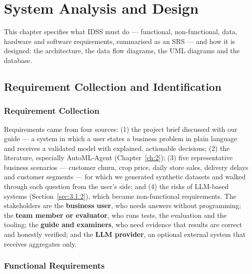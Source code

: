 \chapter{System Analysis and Design}\label{ch:4}

This chapter specifies what IDSS must do --- functional, non-functional, data, hardware and software requirements, summarised as an SRS --- and how it is designed: the architecture, the data flow diagrams, the UML diagrams and the database.

\FloatBarrier
\section{Requirement Collection and Identification}\label{sec:4.1}

\subsection{Requirement Collection}\label{sec:4.1.1}

Requirements came from four sources: (1) the project brief discussed with our guide --- a system in which a user states a business problem in plain language and receives a validated model with explained, actionable decisions; (2) the literature, especially AutoML-Agent \cite{ref9} (Chapter~\ref{ch:2}); (3) five representative business scenarios --- customer churn, crop price, daily store sales, delivery delays and customer segments --- for which we generated synthetic datasets and walked through each question from the user's side; and (4) the risks of LLM-based systems (Section~\ref{sec:3.1.2}), which became non-functional requirements. The stakeholders are the \textbf{business user}, who needs answers without programming; the \textbf{team member or evaluator}, who runs tests, the evaluation and the tooling; the \textbf{guide and examiners}, who need evidence that results are correct and honestly verified; and the \textbf{LLM provider}, an optional external system that receives aggregates only.

\subsection{Functional Requirements}\label{sec:4.1.2}

